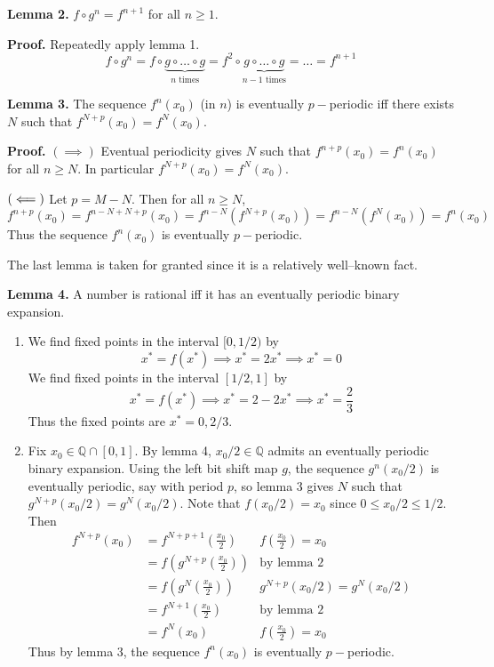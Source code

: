\documentclass{article}
\def\mbb#1{\mathbb{#1}}
\def\tbf#1{\textbf{#1}}
\def\bQ{\mbb{Q}}
\newcommand{\br}[1]{\left(#1\right)}
\newcommand{\imp}{\implies}
\newcommand{\impleft}{\reflectbox{$\implies$}}
\newcommand{\pf}{\tbf{Proof. }}
\begin{document}
\begin{enumerate}
	
	\tbf{Lemma 2.} $f\circ g^n = f^{n+1}$ for all $n\ge1$.
	
	\pf Repeatedly apply lemma 1.
	\[f\circ g^n = f\circ\underbrace{g\circ\dots\circ g}_{n\text{ times}}
	= f^2\circ\underbrace{g\circ\dots\circ g}_{n-1\text{ times}}
	= \dots
	= f^{n+1}\]
	
	
	\tbf{Lemma 3.} The sequence $f^n(x_0)$ (in $n$) is eventually $p-$periodic iff there exists $N$ such that $f^{N+p}(x_0)=f^N(x_0)$.
	
	\pf $(\imp)$ Eventual periodicity gives $N$ such that $f^{n+p}(x_0)=f^n(x_0)$ for all $n\ge N$. In particular $f^{N+p}(x_0)=f^N(x_0)$.
	
	$(\impleft)$ Let $p=M-N$. Then for all $n\ge N$,
	\[f^{n+p}(x_0) = f^{n-N+N+p}(x_0)
	= f^{n-N}(f^{N+p}(x_0))
	= f^{n-N}(f^N(x_0))
	= f^n(x_0)\]
	Thus the sequence $f^n(x_0)$ is eventually $p-$periodic.
	
	
	The last lemma is taken for granted since it is a relatively well--known fact.
	
	\tbf{Lemma 4.} A number is rational iff it has an eventually periodic binary expansion.
	
	
	\begin{enumerate}
		
		
		
		\item We find fixed points in the interval $[0,1/2)$ by
		\[x^* = f(x^*)
		\imp x^* = 2x^*
		\imp x^* = 0\]
		We find fixed points in the interval $[1/2,1]$ by
		\[x^* = f(x^*)
		\imp x^* = 2 - 2x^*
		\imp x^* = \frac23\]
		Thus the fixed points are $x^*=0,2/3$.
		
		
		
		\item Fix $x_0\in\bQ\cap[0,1]$. By lemma 4, $x_0/2\in\bQ$ admits an eventually periodic binary expansion. Using the left bit shift map $g$, the sequence $g^n(x_0/2)$ is eventually periodic, say with period $p$, so lemma 3 gives $N$ such that $g^{N+p}(x_0/2)=g^N(x_0/2)$. Note that $f(x_0/2)=x_0$ since $0\le x_0/2\le1/2$. Then
		\begin{align*}
			f^{N+p}(x_0) &= f^{N+p+1}\br{\frac{x_0}{2}} & f\br{\frac{x_0}{2}}=x_0 \\
			&= f\br{g^{N+p}\br{\frac{x_0}{2}}} & \text{by lemma 2} \\
			&= f\br{g^N\br{\frac{x_0}{2}}} & g^{N+p}(x_0/2)=g^N(x_0/2) \\
			&= f^{N+1}\br{\frac{x_0}{2}} & \text{by lemma 2} \\
			&= f^N(x_0) & f\br{\frac{x_0}{2}}=x_0
		\end{align*}
		Thus by lemma 3, the sequence $f^n(x_0)$ is eventually $p-$periodic.
		

\end{enumerate}
\end{enumerate}
\end{document}
